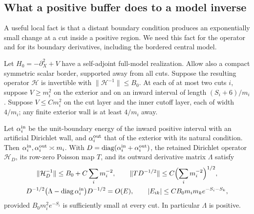 \subsection{What a positive buffer does to a model inverse}

A useful local fact is that a distant boundary condition produces an
exponentially small change at a cut inside a positive region.  We need
this fact for the operator and for its boundary derivatives, including
the bordered central model.

\begin{lemma}\label{lem:fence-compression}
Let $H_0=-\partial_X^2+V$ have a self-adjoint full-model realization.
Allow also a compact symmetric scalar border, supported away from all
cuts.  Suppose the resulting operator $\mathcal H$ is invertible with
$\|\mathcal H^{-1}\|\le B_0$.  At each of at most two cuts $i$, suppose
$V\ge m_i^2$ on the exterior and on an inward interval of length
$(S_i+6)/m_i$.  Suppose $V\le Cm_i^2$ on the cut layer and the inner
cutoff layer, each of width $4/m_i$; any finite exterior wall is at
least $4/m_i$ away.

Let $\alpha_i^{\rm in}$ be the unit-boundary energy of the inward
positive interval with an artificial Dirichlet wall, and
$\alpha_i^{\rm out}$ that of the exterior with its natural condition.
Then $\alpha_i^{\rm in},\alpha_i^{\rm out}\asymp m_i$.
With $D=\operatorname{diag}(\alpha_i^{\rm in}+\alpha_i^{\rm out})$,
the retained Dirichlet operator $\mathcal H_D$, its row-zero Poisson
map $T$, and its outward derivative matrix $\Lambda$ satisfy
\begin{equation}\label{eq:buffer-estimates-new}
 \begin{gathered}
 \|\mathcal H_D^{-1}\|\le B_0+C\sum_i m_i^{-2},\qquad
 \|TD^{-1/2}\|\le C\Bigl(\sum_i m_i^{-2}\Bigr)^{1/2},\\
 D^{-1/2}\bigl(\Lambda-\operatorname{diag}\alpha_i^{\rm in}\bigr)D^{-1/2}
       =O(E),\qquad
 |E_{ik}|\le CB_0m_im_ke^{-S_i-S_k},
 \end{gathered}
\end{equation}
provided $B_0m_i^2e^{-S_i}$ is sufficiently small at every cut.
In particular $\Lambda$ is positive.
\end{lemma}

